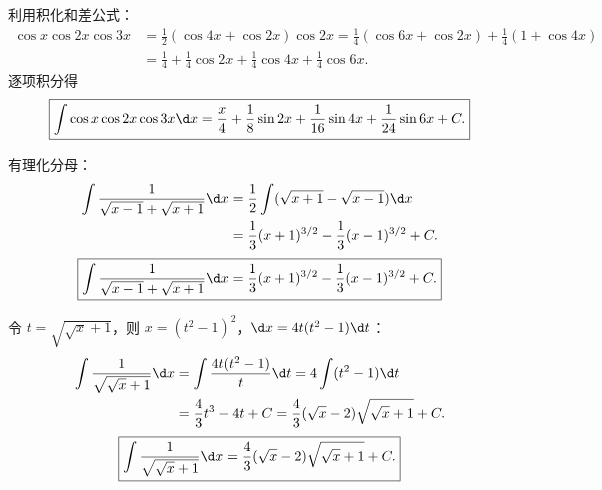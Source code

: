 \begin{solution}

    利用积化和差公式：
    \begin{equation}
        \begin{aligned}
            \cos x \cos 2x \cos 3x & = \frac{1}{2}(\cos 4x + \cos 2x)\cos 2x = \frac{1}{4}(\cos 6x + \cos 2x) + \frac{1}{4}(1 + \cos 4x) \\
                                   & = \frac{1}{4} + \frac{1}{4}\cos 2x + \frac{1}{4}\cos 4x + \frac{1}{4}\cos 6x.
        \end{aligned}
    \end{equation}
    逐项积分得
    \begin{equation}
        \boxed{\int \cos x \cos 2x \cos 3x \d x = \frac{x}{4} + \frac{1}{8}\sin 2x + \frac{1}{16}\sin 4x + \frac{1}{24}\sin 6x + C.}
    \end{equation}


    有理化分母：
    \begin{equation}
        \begin{aligned}
            \int \frac{1}{\sqrt{x - 1} + \sqrt{x + 1}} \d x & = \frac{1}{2}\int (\sqrt{x + 1} - \sqrt{x - 1}) \d x       \\
                                                            & = \frac{1}{3}(x + 1)^{3/2} - \frac{1}{3}(x - 1)^{3/2} + C.
        \end{aligned}
    \end{equation}
    \begin{equation}
        \boxed{\int \frac{1}{\sqrt{x - 1} + \sqrt{x + 1}} \d x = \frac{1}{3}(x + 1)^{3/2} - \frac{1}{3}(x - 1)^{3/2} + C.}
    \end{equation}


    令 $t = \sqrt{\sqrt{x} + 1}$，则 $x = (t^2 - 1)^2$，$\d x = 4t(t^2 - 1)\d t$：
    \begin{equation}
        \begin{aligned}
            \int \frac{1}{\sqrt{\sqrt{x} + 1}} \d x & = \int \frac{4t(t^2 - 1)}{t} \d t = 4\int (t^2 - 1) \d t                      \\
                                                    & = \frac{4}{3}t^3 - 4t + C = \frac{4}{3}(\sqrt{x} - 2)\sqrt{\sqrt{x} + 1} + C.
        \end{aligned}
    \end{equation}
    \begin{equation}
        \boxed{\int \frac{1}{\sqrt{\sqrt{x} + 1}} \d x = \frac{4}{3}(\sqrt{x} - 2)\sqrt{\sqrt{x} + 1} + C.}
    \end{equation}


\end{solution}
